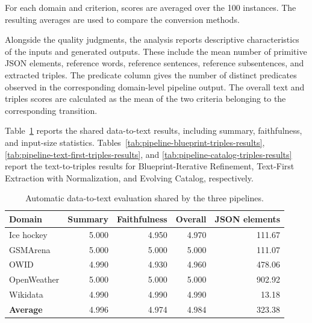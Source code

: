For each domain and criterion, scores are averaged over the 100 instances. The
resulting averages are used to compare the conversion methods.

Alongside the quality judgments, the analysis reports descriptive characteristics
of the inputs and generated outputs. These include the mean number of primitive
JSON elements, reference words, reference sentences, reference subsentences, and
extracted triples. The predicate column gives the number of distinct predicates
observed in the corresponding domain-level pipeline output. The overall text and
triples scores are calculated as the mean of the two criteria belonging to the
corresponding transition.

Table~\ref{tab:pipeline-text-results} reports the shared data-to-text results,
including summary, faithfulness, and input-size statistics.
Tables~\ref{tab:pipeline-blueprint-triples-results},
\ref{tab:pipeline-text-first-triples-results}, and
\ref{tab:pipeline-catalog-triples-results} report the text-to-triples results
for Blueprint-Iterative Refinement, Text-First Extraction with Normalization,
and Evolving Catalog, respectively.

\begin{table}[!htbp]
\centering
\caption{Automatic data-to-text evaluation shared by the three pipelines.}
\label{tab:pipeline-text-results}
\begin{tabular}{lrrrr}
\hline
\textbf{Domain} & \textbf{Summary} & \textbf{Faithfulness} & \textbf{Overall} & \textbf{JSON elements} \\
\hline
Ice hockey & 5.000 & 4.950 & 4.970 & 111.67 \\
GSMArena & 5.000 & 5.000 & 5.000 & 111.07 \\
OWID & 4.990 & 4.930 & 4.960 & 478.06 \\
OpenWeather & 5.000 & 5.000 & 5.000 & 902.92 \\
Wikidata & 4.990 & 4.990 & 4.990 & 13.18 \\
\hline
\textbf{Average} & 4.996 & 4.974 & 4.984 & 323.38 \\
\hline
\end{tabular}
\end{table}

